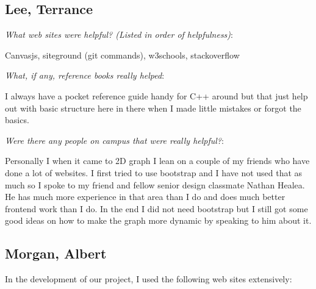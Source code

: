 \documentclass[10pt,draftclsnofoot,onecolumn]{IEEEtran}
\newcommand{\subsubsubsection}[1]{
	\hfill\break\textit{#1}:
}
\begin{document}

\subsection{Lee, Terrance}

\subsubsubsection{What web sites were helpful? (Listed in order of helpfulness)}
Canvasjs, siteground (git commands), w3schools, stackoverflow

\subsubsubsection{What, if any, reference books really helped}
I always have a pocket reference guide handy for C++ around but that just help out with basic structure here in there when I made little mistakes or forgot the basics.  

\subsubsubsection{Were there any people on campus that were really helpful?}
Personally I when it came to 2D graph I lean on a couple of my friends who have done a lot of websites. I first tried to use bootstrap and I have not used that as much so I spoke to my friend and fellow senior design classmate Nathan Healea.  He has much more experience in that area than I do and does much better frontend work than I do.  In the end I did not need bootstrap but I still got some good ideas on how to make the graph more dynamic by speaking to him about it.  

\subsection{Morgan, Albert}


In the development of our project, I used the following web sites extensively:
\end{document}
